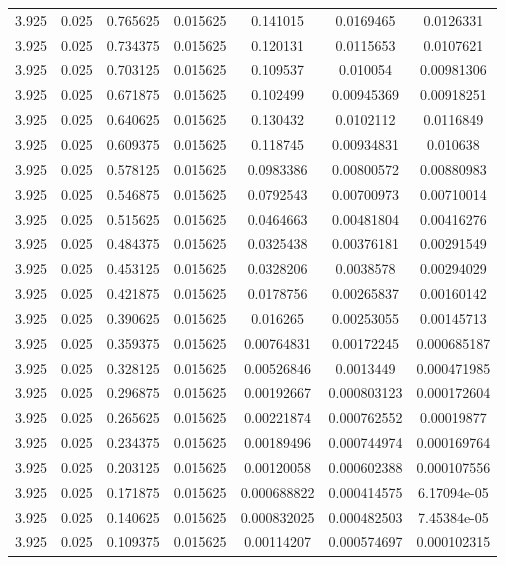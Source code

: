 \begin{flushleft}
\begin{longtable}{ccccccc}
3.925 & 0.025 & 0.765625 & 0.015625 & 0.141015 & 0.0169465 & 0.0126331  \\ 
3.925 & 0.025 & 0.734375 & 0.015625 & 0.120131 & 0.0115653 & 0.0107621  \\ 
3.925 & 0.025 & 0.703125 & 0.015625 & 0.109537 & 0.010054 & 0.00981306  \\ 
3.925 & 0.025 & 0.671875 & 0.015625 & 0.102499 & 0.00945369 & 0.00918251  \\ 
3.925 & 0.025 & 0.640625 & 0.015625 & 0.130432 & 0.0102112 & 0.0116849  \\ 
3.925 & 0.025 & 0.609375 & 0.015625 & 0.118745 & 0.00934831 & 0.010638  \\ 
3.925 & 0.025 & 0.578125 & 0.015625 & 0.0983386 & 0.00800572 & 0.00880983  \\ 
3.925 & 0.025 & 0.546875 & 0.015625 & 0.0792543 & 0.00700973 & 0.00710014  \\ 
3.925 & 0.025 & 0.515625 & 0.015625 & 0.0464663 & 0.00481804 & 0.00416276  \\ 
3.925 & 0.025 & 0.484375 & 0.015625 & 0.0325438 & 0.00376181 & 0.00291549  \\ 
3.925 & 0.025 & 0.453125 & 0.015625 & 0.0328206 & 0.0038578 & 0.00294029  \\ 
3.925 & 0.025 & 0.421875 & 0.015625 & 0.0178756 & 0.00265837 & 0.00160142  \\ 
3.925 & 0.025 & 0.390625 & 0.015625 & 0.016265 & 0.00253055 & 0.00145713  \\ 
3.925 & 0.025 & 0.359375 & 0.015625 & 0.00764831 & 0.00172245 & 0.000685187  \\ 
3.925 & 0.025 & 0.328125 & 0.015625 & 0.00526846 & 0.0013449 & 0.000471985  \\ 
3.925 & 0.025 & 0.296875 & 0.015625 & 0.00192667 & 0.000803123 & 0.000172604  \\ 
3.925 & 0.025 & 0.265625 & 0.015625 & 0.00221874 & 0.000762552 & 0.00019877  \\ 
3.925 & 0.025 & 0.234375 & 0.015625 & 0.00189496 & 0.000744974 & 0.000169764  \\ 
3.925 & 0.025 & 0.203125 & 0.015625 & 0.00120058 & 0.000602388 & 0.000107556  \\ 
3.925 & 0.025 & 0.171875 & 0.015625 & 0.000688822 & 0.000414575 & 6.17094e-05  \\ 
3.925 & 0.025 & 0.140625 & 0.015625 & 0.000832025 & 0.000482503 & 7.45384e-05  \\ 
3.925 & 0.025 & 0.109375 & 0.015625 & 0.00114207 & 0.000574697 & 0.000102315  \\ 

\end{longtable}
\end{flushleft}
